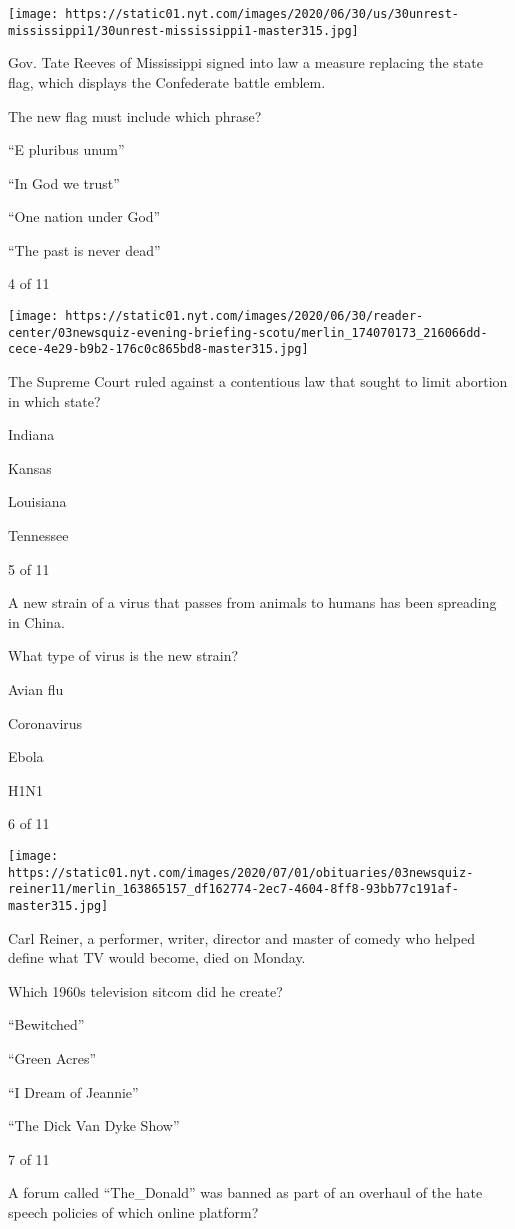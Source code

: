 \texttt{[image: https://static01.nyt.com/images/2020/06/30/us/30unrest-mississippi1/30unrest-mississippi1-master315.jpg]}

Gov. Tate Reeves of Mississippi signed into law a measure replacing the
state flag, which displays the Confederate battle emblem.

The new flag must include which phrase?

``E pluribus unum''

``In God we trust''

``One nation under God''

``The past is never dead''

4 of 11

\texttt{[image: https://static01.nyt.com/images/2020/06/30/reader-center/03newsquiz-evening-briefing-scotu/merlin\_174070173\_216066dd-cece-4e29-b9b2-176c0c865bd8-master315.jpg]}

The Supreme Court ruled against a contentious law that sought to limit
abortion in which state?

Indiana

Kansas

Louisiana

Tennessee

5 of 11

A new strain of a virus that passes from animals to humans has been
spreading in China.

What type of virus is the new strain?

Avian flu

Coronavirus

Ebola

H1N1

6 of 11

\texttt{[image: https://static01.nyt.com/images/2020/07/01/obituaries/03newsquiz-reiner11/merlin\_163865157\_df162774-2ec7-4604-8ff8-93bb77c191af-master315.jpg]}

Carl Reiner, a performer, writer, director and master of comedy who
helped define what TV would become, died on Monday.

Which 1960s television sitcom did he create?

``Bewitched''

``Green Acres''

``I Dream of Jeannie''

``The Dick Van Dyke Show''

7 of 11

A forum called ``The\_Donald'' was banned as part of an overhaul of the
hate speech policies of which online platform?

